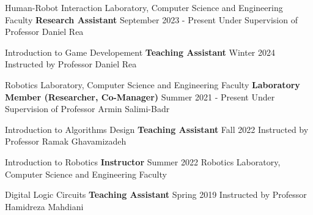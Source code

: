 \begin{cventries}

    
    \cventry
    {Human-Robot Interaction Laboratory, Computer Science and Engineering Faculty}
    {\bullet \space \textbf {Research Assistant}}
    {}
    {September 2023 - Present}
    {Under Supervision of Professor Daniel Rea}
    \vspace{0.4 cm}

    \cventry
    {Introduction to Game Developement
    }
    {\bullet \space \textbf {Teaching Assistant}}
    {}
    {Winter 2024}
    {Instructed by Professor Daniel Rea}
    \vspace{0.4 cm}

    \cventry
    {Robotics Laboratory, Computer Science and Engineering Faculty}
    {\bullet \space \textbf {Laboratory Member (Researcher, Co-Manager)}}
    {}
    {Summer 2021 - Present}
    {Under Supervision of Professor Armin Salimi-Badr}
    \vspace{0.4 cm}

    \cventry
    {Introduction to Algorithms Design}
    {\bullet \space \textbf {Teaching Assistant}}
    {}
    {Fall 2022}
    {Instructed by Professor Ramak Ghavamizadeh}
    \vspace{0.4 cm}
    
    \cventry
    {Introduction to Robotics}
    {\bullet \space \textbf {Instructor}}
    {}
    {Summer 2022}
    {Robotics Laboratory, Computer Science and Engineering Faculty}
    \vspace{0.4 cm}
    
    \cventry
    {Digital Logic Circuits}
    {\bullet \space \textbf {Teaching Assistant}}
    {}
    {Spring 2019}
    {Instructed by Professor Hamidreza Mahdiani}
    
\end{cventries}